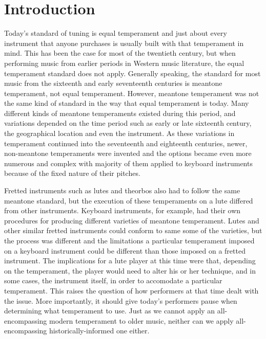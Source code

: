 \chapter*{Introduction}

Today's standard of tuning is equal temperament and just about every instrument that
anyone purchases is usually built with that temperament in mind.  This has been the
case for most of the twentieth century, but when performing music from earlier periods
in Western music literature, the equal temperament standard does not apply.  Generally
speaking, the standard for most music from the sixteenth and early seventeenth
centuries is meantone temperament, not equal temperament. However, meantone temperament
was not the same kind of standard in the way that equal temperament is today.  Many
different kinds of meantone temperaments existed during this period, and variations
depended on the time period such as early or late sixteenth century, the geographical
location and even the instrument.  As these variations in temperament continued into
the seventeenth and eighteenth centuries, newer, non-meantone temperaments were
invented and the options became even more numerous and complex with majority of them
applied to keyboard instruments because of the fixed nature of their pitches.

Fretted instruments such as lutes and theorbos also had to follow the same meantone
standard, but the execution of these temperaments on a lute differed from other
instruments. Keyboard instruments, for example, had their own procedures for producing
different varieties of meantone temperament.  Lutes and other similar fretted
instruments could conform to same some of the varieties, but the process was different
and the limitations a particular temperament imposed on a keyboard instrument could be
different than those imposed on a fretted instrument.  The implications for a lute
player at this time were that, depending on the temperament, the player would need to
alter his or her technique, and in some cases, the instrument itself, in order to
accomodate a particular temperament. This raises the question of how performers at that
time dealt with the issue.  More importantly, it should give today's performers pause
when determining what temperament to use.  Just as we cannot apply an all-encompassing
modern temperament to older music, neither can we apply all-encompassing
historically-informed one either.

